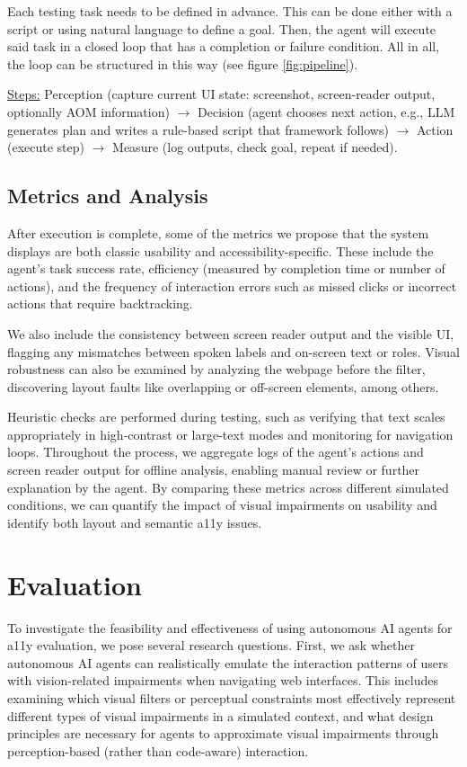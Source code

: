 Each testing task needs to be defined in advance. This can be done either with a script or using natural language to define a goal. Then, the agent will execute said task in a closed loop that has a completion or failure condition. All in all, the loop can be structured in this way (see figure \ref{fig:pipeline}).

\underline{Steps:} Perception (capture current \ac{UI} state: screenshot, screen-reader output, optionally \ac{AOM} information) $\rightarrow$ Decision (agent chooses next action, e.g., LLM generates plan and writes a rule-based script that framework follows) $\rightarrow$ Action (execute step) $\rightarrow$ Measure (log outputs, check goal, repeat if needed).


\subsection{Metrics and Analysis}

After execution is complete, some of the metrics we propose that the system displays are both classic usability and accessibility-specific. These include the agent's task success rate, efficiency (measured by completion time or number of actions), and the frequency of interaction errors such as missed clicks or incorrect actions that require backtracking. 

We also include the consistency between screen reader output and the visible \ac{UI}, flagging any mismatches between spoken labels and on-screen text or roles. Visual robustness can also be examined by analyzing the webpage before the filter, discovering layout faults like overlapping or off-screen elements, among others. 

Heuristic checks are performed during testing, such as verifying that text scales appropriately in high-contrast or large-text modes and monitoring for navigation loops. Throughout the process, we aggregate logs of the agent's actions and screen reader output for offline analysis, enabling manual review or further explanation by the agent. By comparing these metrics across different simulated conditions, we can quantify the impact of visual impairments on usability and identify both layout and semantic \ac{a11y} issues.

\section{Evaluation}

To investigate the feasibility and effectiveness of using autonomous AI agents for \ac{a11y} evaluation, we pose several research questions. First, we ask whether autonomous AI agents can realistically emulate the interaction patterns of users with vision-related impairments when navigating web interfaces. This includes examining which visual filters or perceptual constraints most effectively represent different types of visual impairments in a simulated context, and what design principles are necessary for agents to approximate visual impairments through perception-based (rather than code-aware) interaction.

